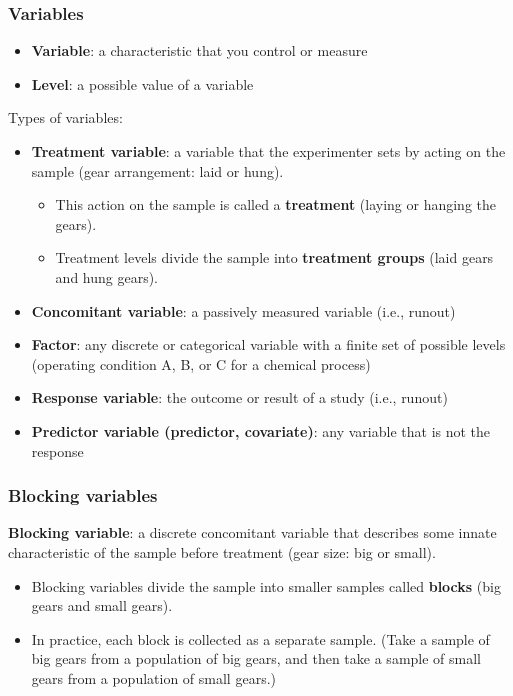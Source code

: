 \documentclass[handout]{beamer}\usepackage{graphicx, color}
\numberwithin{equation}{section}
\begin{document}
\begin{frame}
\frametitle{Variables} \scriptsize

\begin{itemize}
\item  {\bf Variable}: a characteristic that you control or measure
\pause \item {\bf Level}: a possible value of a variable
\end{itemize}

\pause Types of variables:

\begin{itemize}
\item {\bf Treatment variable}: a variable that the experimenter sets by acting on the sample (gear arrangement: laid or hung).
\begin{itemize}
\pause \item This action on the sample is called a {\bf treatment} (laying or hanging the gears).
\pause \item Treatment levels divide the sample into {\bf treatment groups} (laid gears and hung gears).
\end{itemize}
\pause \item {\bf Concomitant variable}: a passively measured variable (i.e., runout)
\pause \item {\bf Factor}: any discrete or categorical variable with a finite set of possible levels (operating condition A, B, or C for a chemical process)
\pause \item {\bf Response variable}: the outcome or result of a study (i.e., runout)
\pause \item {\bf Predictor variable (predictor, covariate)}: any variable that is not the response
\end{itemize}
\end{frame}


\begin{frame}
\frametitle{Blocking variables}

{\bf Blocking variable}: a discrete concomitant variable that describes some innate characteristic of the sample before treatment (gear size: big or small).  
\begin{itemize}
\pause \item Blocking variables divide the sample into smaller samples called {\bf blocks} (big gears and small gears).
\pause \item In practice, each block is collected as a separate sample. (Take a sample of big gears from a population of big gears, and then take a sample of small gears from a population of small gears.)
\end{itemize}
\end{frame}
\end{document}
